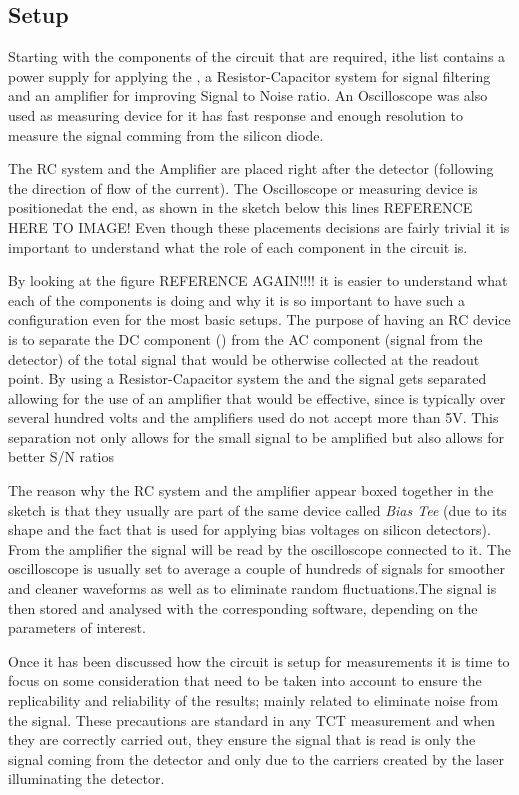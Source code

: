 \subsection{Setup} 

Starting with the components of the circuit that are required, ithe list contains a power supply for applying the \vias, a Resistor-Capacitor system for signal filtering and an amplifier for improving Signal to Noise ratio. An Oscilloscope was also used as measuring device for it has fast response and enough resolution to measure the signal comming from the silicon diode.

The RC system and the Amplifier are placed right after the detector (following the direction of flow of the current). The Oscilloscope or measuring device is positionedat the end, as shown in the sketch below this lines REFERENCE HERE TO IMAGE! Even though these placements decisions are fairly trivial it is important to understand what the role of each component in the circuit is.

By looking at the figure REFERENCE AGAIN!!!! it is easier to understand what each of the components is doing and why it is so important to have such a configuration even for the most basic setups. The purpose of having an RC device is to separate the DC component (\vias) from the AC component (signal from the detector) of the total signal that would be otherwise collected at the readout point. By using a Resistor-Capacitor system the \vias and the signal gets separated allowing for the use of an amplifier that would be effective, since \vias is typically over several hundred volts and the amplifiers used do not accept more than 5V. This separation not only allows for the small signal to be amplified but also allows for better S/N ratios 

The reason why the RC system and the amplifier appear boxed together in the sketch is that they usually are part of the same device called \textit{Bias Tee} (due to its shape and the fact that is used for applying bias voltages on silicon detectors). From the amplifier the signal will be read by the oscilloscope connected to it. The oscilloscope is usually set to average a couple of hundreds of signals for smoother and cleaner waveforms as well as to eliminate random fluctuations.The signal is then stored and analysed with the corresponding software, depending on the parameters of interest.

Once it has been discussed how the circuit is setup for measurements it is time to focus on some consideration that need to be taken into account to ensure the replicability and reliability of the results; mainly related to eliminate noise from the signal. These precautions are standard in any TCT measurement and when they are correctly carried out, they ensure the signal that is read is  only the signal coming from the detector and only due to the carriers created by the laser illuminating the detector.

